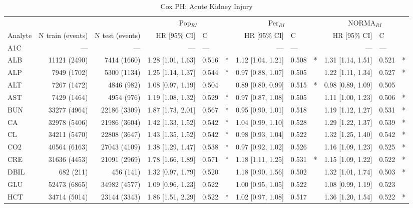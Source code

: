\begin{table}[ht]
\centering
\footnotesize
\caption{Cox PH: Acute Kidney Injury}
\begin{tabular}{lrrrlcrlcrlc}
\toprule
 & &  & \multicolumn{3}{c}{Pop$_{RI}$} & \multicolumn{3}{c}{Per$_{RI}$} & \multicolumn{3}{c}{NORMA$_{RI}$} \\
\cmidrule(lr){4-6} \cmidrule(lr){7-9} \cmidrule(lr){10-12}
Analyte & N train (events) & N test (events) & HR [95\% CI] & C &  & HR [95\% CI] & C &  & HR [95\% CI] & C &  \\
\midrule
A1C & --- & --- & --- & --- &  & --- & --- &  & --- & --- &  \\
ALB & 11121 (2490) & 7414 (1660) & 1.28 [1.01, 1.63] & 0.516 & * & 1.12 [1.04, 1.21] & 0.508 & * & 1.31 [1.14, 1.51] & 0.521 & * \\
ALP & 7949 (1702) & 5300 (1134) & 1.25 [1.14, 1.37] & 0.544 & * & 0.97 [0.88, 1.07] & 0.505 &  & 1.22 [1.11, 1.34] & 0.527 & * \\
ALT & 7267 (1472) & 4846 (982) & 1.08 [0.97, 1.19] & 0.504 &  & 0.89 [0.80, 0.99] & 0.515 & * & 0.98 [0.89, 1.09] & 0.505 &  \\
AST & 7429 (1464) & 4954 (976) & 1.19 [1.08, 1.32] & 0.529 & * & 0.97 [0.87, 1.08] & 0.505 &  & 1.11 [1.00, 1.23] & 0.506 & * \\
BUN & 33277 (4964) & 22186 (3309) & 1.87 [1.73, 2.01] & 0.567 & * & 0.95 [0.90, 1.01] & 0.518 &  & 1.19 [1.12, 1.27] & 0.531 & * \\
CA & 32978 (5406) & 21986 (3604) & 1.42 [1.33, 1.52] & 0.542 & * & 1.04 [0.99, 1.10] & 0.528 &  & 1.29 [1.22, 1.37] & 0.539 & * \\
CL & 34211 (5470) & 22808 (3647) & 1.43 [1.35, 1.52] & 0.542 & * & 0.98 [0.93, 1.04] & 0.522 &  & 1.32 [1.25, 1.40] & 0.542 & * \\
CO2 & 40564 (6163) & 27043 (4109) & 1.38 [1.29, 1.47] & 0.538 & * & 0.97 [0.92, 1.02] & 0.526 &  & 1.16 [1.09, 1.23] & 0.525 & * \\
CRE & 31636 (4453) & 21091 (2969) & 1.78 [1.66, 1.89] & 0.571 & * & 1.18 [1.11, 1.25] & 0.531 & * & 1.15 [1.09, 1.22] & 0.522 & * \\
DBIL & 682 (211) & 456 (141) & 1.32 [0.97, 1.79] & 0.520 &  & 1.18 [0.90, 1.56] & 0.502 &  & 1.32 [1.01, 1.74] & 0.503 & * \\
GLU & 52473 (6865) & 34982 (4577) & 1.09 [0.96, 1.23] & 0.522 &  & 1.00 [0.95, 1.05] & 0.522 &  & 1.08 [0.99, 1.19] & 0.523 &  \\
HCT & 34714 (5014) & 23144 (3343) & 1.86 [1.51, 2.29] & 0.522 & * & 1.02 [0.97, 1.08] & 0.517 &  & 1.36 [1.20, 1.54] & 0.522 & * \\

\end{tabular}
\end{table}
